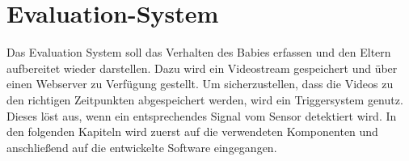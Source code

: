 \section{Evaluation-System}
\label{sec:eval_sys}

Das Evaluation System soll das Verhalten des Babies erfassen und den Eltern aufbereitet wieder darstellen. Dazu wird ein Videostream gespeichert und über einen Webserver zu Verfügung gestellt. Um sicherzustellen, dass die Videos zu den richtigen Zeitpunkten abgespeichert werden, wird ein Triggersystem genutz. Dieses löst aus, wenn ein entsprechendes Signal vom Sensor detektiert wird. In den folgenden Kapiteln wird zuerst auf die verwendeten Komponenten und anschließend auf die entwickelte Software eingegangen.




